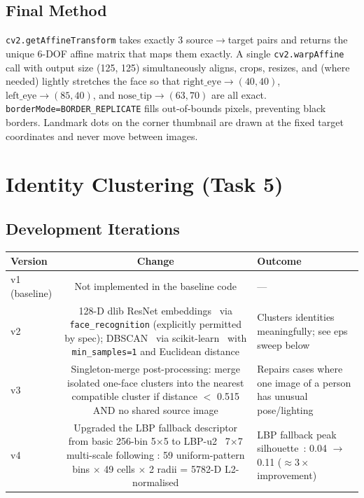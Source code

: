 \subsection{Final Method}
\texttt{cv2.getAffineTransform} takes exactly 3 source$\rightarrow$target pairs
and returns the unique 6-DOF affine matrix that maps them exactly. A single
\texttt{cv2.warpAffine} call with output size (125, 125) simultaneously aligns,
crops, resizes, and (where needed) lightly stretches the face so that
$\text{right\_eye} \to (40, 40)$, $\text{left\_eye} \to (85, 40)$, and
$\text{nose\_tip} \to (63, 70)$ are all exact. \texttt{borderMode=BORDER\_REPLICATE}
fills out-of-bounds pixels, preventing black borders. Landmark dots on the
corner thumbnail are drawn at the fixed target coordinates and never move
between images.

\section{Identity Clustering (Task 5)}

\subsection{Development Iterations}
\noindent
\begin{tabularx}{\linewidth}{@{}V C O@{}}
\toprule
\textbf{Version} & \textbf{Change} & \textbf{Outcome} \\
\midrule
v1 (baseline) & Not implemented in the baseline code & --- \\
v2 & 128-D dlib ResNet embeddings~\citep{king2009dlib} via \texttt{face\_recognition}
     (explicitly permitted by spec); DBSCAN~\citep{ester1996density} via
     scikit-learn~\citep{pedregosa2011scikit} with \texttt{min\_samples=1} and
     Euclidean distance
   & Clusters identities meaningfully; see eps sweep below \\
v3 & Singleton-merge post-processing: merge isolated one-face clusters into
     the nearest compatible cluster if distance $<$ 0.515 AND no shared
     source image
   & Repairs cases where one image of a person has unusual pose/lighting \\
v4 & Upgraded the LBP fallback descriptor from basic 256-bin 5$\times$5 to
     LBP-u2~\citep{ojala2002multiresolution} 7$\times$7 multi-scale
     following \citet{ahonen2006face}: 59 uniform-pattern bins
     $\times$ 49 cells $\times$ 2 radii = 5782-D L2-normalised
   & LBP fallback peak silhouette~\citep{rousseeuw1987silhouettes}:
     0.04 $\to$ 0.11 ($\approx 3\times$ improvement) \\
\bottomrule
\end{tabularx}

